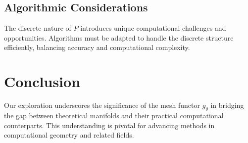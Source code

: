 \documentclass{article}
\begin{document}
\subsection{Algorithmic Considerations}
The discrete nature of \( P \) introduces unique computational challenges and opportunities. Algorithms must be adapted to handle the discrete structure efficiently, balancing accuracy and computational complexity.

\section{Conclusion}
Our exploration underscores the significance of the mesh functor \( g_\theta \) in bridging the gap between theoretical manifolds and their practical computational counterparts. This understanding is pivotal for advancing methods in computational geometry and related fields.
\end{document}
